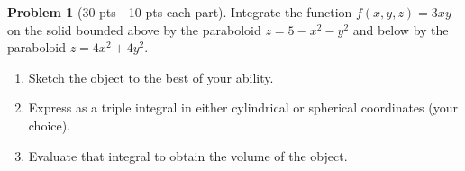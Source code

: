 \documentclass[12pt]{article}
\theoremstyle{definition}
\newtheorem{problem}{Problem}
\begin{document}
\bigskip
\begin{problem}[30 pts---10 pts each part]
Integrate the function $f(x,y,z)=3xy$ on the solid bounded above by the paraboloid $z=5-x^2-y^2$ and below by the paraboloid $z=4x^2+4y^2$.
\begin{enumerate}
\item Sketch the object to the best of your ability.
\vspace{5cm}
\item Express as a triple integral in either cylindrical or spherical coordinates (your choice).
\vspace{5cm}
\begin{flushright}
\end{flushright}
\item Evaluate that integral to obtain the volume of the object.
\vspace{5cm}
\begin{flushright}
\end{flushright}
\end{enumerate}
\end{problem}
\end{document}
